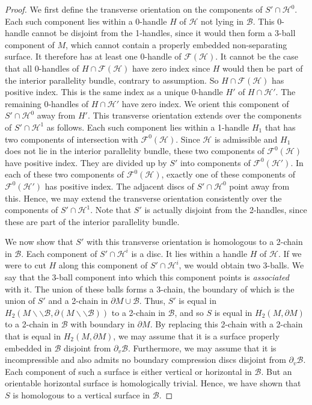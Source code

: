 \documentclass[oneside]{amsart}
\numberwithin{equation}{section}
\theoremstyle{plain}
\theoremstyle{definition}
\newcommand{\cut}{\backslash\backslash}
\newcommand{\calB}{\mathcal{B}}
\begin{document}
\begin{proof}
We first define the transverse orientation on the components of $S' \cap \mathcal{H}^0$. Each such component lies within a 0-handle $H$ of $\mathcal{H}$ not lying in $\calB$. This 0-handle cannot be disjoint from the 1-handles, since it would then form a 3-ball component of $M$, which cannot contain a properly embedded non-separating surface. It therefore has at least one 0-handle of $\mathcal{F}(\mathcal{H})$. It cannot be the case that all 0-handles of $H \cap \mathcal{F}(\mathcal{H})$ have zero index since $H$ would then be part of the interior parallelity bundle, contrary to assumption. So $H \cap \mathcal{F}(\mathcal{H})$ has positive index. This is the same index as a unique 0-handle $H'$ of $H \cap \mathcal{H}'$.
The remaining 0-handles of $H \cap \mathcal{H}'$ have zero index. We orient this component of $S' \cap \mathcal{H}^0$ away from $H'$. This transverse orientation extends over the components of $S' \cap \mathcal{H}^1$ as follows. Each such component lies within a 1-handle $H_1$ that has two components of intersection with $\mathcal{F}^0(\mathcal{H})$. Since $\mathcal{H}$ is admissible and $H_1$ does not lie in the interior parallelity bundle, these two components of $\mathcal{F}^0(\mathcal{H})$ have positive index. They are divided up by $S'$ into components of $\mathcal{F}^0(\mathcal{H}')$. In each of these two components of $\mathcal{F}^0(\mathcal{H})$, exactly one of these components of $\mathcal{F}^0(\mathcal{H}')$ has positive index. The adjacent discs of $S' \cap \mathcal{H}^0$ point away from this. Hence, we may extend the transverse orientation consistently over the components of $S' \cap \mathcal{H}^1$. Note that $S'$ is actually disjoint from the 2-handles, since these are part of the interior parallelity bundle.

We now show that $S'$ with this transverse orientation is homologous to a 2-chain in $\calB$. Each component of $S' \cap \mathcal{H}^i$ is a disc. It lies within a handle $H$ of $\mathcal{H}$. If we were to cut $H$ along this component of $S' \cap \mathcal{H}^i$, we would obtain two 3-balls. We say that the 3-ball component into which this component points is \emph{associated} with it. The union of these balls forms a 3-chain, the boundary of which is the union of $S'$ and a 2-chain in $\partial M \cup \calB$. Thus, $S'$ is equal in $H_2(M \cut \calB, \partial (M \cut \calB))$ to a 2-chain in $\calB$, and so
 $S$ is equal in $H_2(M, \partial M)$ to a 2-chain in $\calB$ with boundary in $\partial M$. By replacing this 2-chain with a 2-chain that is equal in $H_2(M, \partial M)$, we may assume that it is a surface properly embedded in $\calB$ disjoint from $\partial_v \calB$. Furthermore, we may assume that it is incompressible and also admits no boundary compression discs disjoint from $\partial_v \calB$. Each component of such a surface is either vertical or horizontal in $\calB$. But an orientable horizontal surface is homologically trivial. Hence, we have shown that $S$ is homologous to a vertical surface in $\calB$.
\end{proof}
\end{document}
